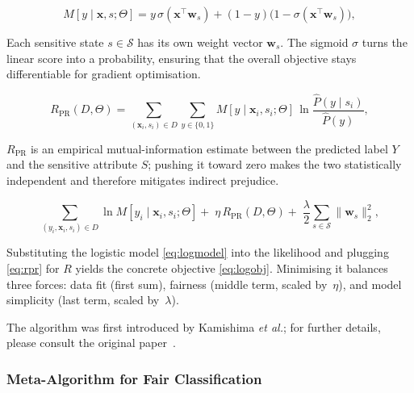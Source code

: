 \documentclass[12pt,a4paper,openright,twoside]{book}
\begin{document}
\begin{equation}
M[y\mid\mathbf{x},s;\Theta]=
y\,\sigma(\mathbf{x}^{\top}\mathbf{w}_{s})+
(1-y)\bigl(1-\sigma(\mathbf{x}^{\top}\mathbf{w}_{s})\bigr),
\tag{8}\label{eq:logmodel}
\end{equation}

\noindent
Each sensitive state \(s\in\mathcal{S}\) has its own weight vector \(\mathbf{w}_{s}\).  The sigmoid \(\sigma\) turns the linear score into a probability, ensuring that the overall objective stays differentiable for gradient optimisation.

\begin{equation}
R_{\mathrm{PR}}(D,\Theta)=
\sum_{(\mathbf{x}_i,s_i)\in D}
\sum_{y\in\{0,1\}}
M[y\mid\mathbf{x}_i,s_i;\Theta]\,
\ln\frac{\hat{P}(y\mid s_i)}{\hat{P}(y)},
\tag{11}\label{eq:rpr}
\end{equation}

\noindent
\(R_{\mathrm{PR}}\) is an empirical mutual-information estimate between the predicted label \(Y\) and the sensitive attribute \(S\); pushing it toward zero makes the two statistically independent and therefore mitigates indirect prejudice.

\begin{equation}
\sum_{(y_i,\mathbf{x}_i,s_i)\in D}
\ln M[y_i\mid\mathbf{x}_i,s_i;\Theta]
+\;
\eta\,R_{\mathrm{PR}}(D,\Theta)
+\;
\frac{\lambda}{2}\sum_{s\in\mathcal{S}}\lVert\mathbf{w}_{s}\rVert_{2}^{2},
\tag{12}\label{eq:logobj}
\end{equation}

\noindent
Substituting the logistic model \eqref{eq:logmodel} into the likelihood and plugging \eqref{eq:rpr} for \(R\) yields the concrete objective \eqref{eq:logobj}.  Minimising it balances three forces: data fit (first sum), fairness (middle term, scaled by~\(\eta\)), and model simplicity (last term, scaled by~\(\lambda\)).

The algorithm was first introduced by Kamishima \emph{et al.}; for further details, please consult the original paper~\cite{kamishima2012prejudiceremoverregularizer}.

\subsubsection{Meta-Algorithm for Fair Classification}
\end{document}
